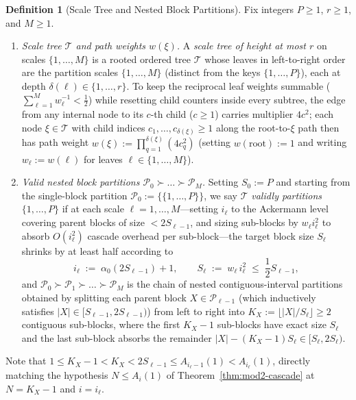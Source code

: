 \documentclass[11pt]{article}
\theoremstyle{definition}
\newtheorem{definition}[theorem]{Definition}
\theoremstyle{remark}
\begin{document}
\begin{definition}[Scale Tree and Nested Block Partitions]
\label{def:scale-tree}
Fix integers $P \ge 1$, $r \ge 1$, and $M \ge 1$.
\begin{enumerate}[label=(\arabic*), leftmargin=2em, itemsep=2pt]
  \item \emph{Scale tree $\mathcal{T}$ and path weights $w(\xi)$.} A \emph{scale tree of height at most $r$} on scales $\{1, \dots, M\}$ is a rooted ordered tree $\mathcal{T}$ whose leaves in left-to-right order are the partition scales $\{1, \dots, M\}$ (distinct from the keys $\{1, \dots, P\}$), each at depth $\delta(\ell) \in \{1, \dots, r\}$. To keep the reciprocal leaf weights summable ($\sum_{\ell=1}^M w_\ell^{-1} < \frac{1}{2}$) while resetting child counters inside every subtree, the edge from any internal node to its $c$-th child ($c \ge 1$) carries multiplier $4 c^2$; each node $\xi \in \mathcal{T}$ with child indices $c_1, \dots, c_{\delta(\xi)} \ge 1$ along the root-to-$\xi$ path then has path weight $w(\xi) := \prod_{q=1}^{\delta(\xi)} (4 c_q^2)$ (setting $w(\mathrm{root}) := 1$ and writing $w_\ell := w(\ell)$ for leaves $\ell \in \{1, \dots, M\}$).
  \item \emph{Valid nested block partitions $\mathcal{P}_0 \succ \dots \succ \mathcal{P}_M$.} Setting $S_0 := P$ and starting from the single-block partition $\mathcal{P}_0 := \{\{1, \dots, P\}\}$, we say $\mathcal{T}$ \emph{validly partitions} $\{1, \dots, P\}$ if at each scale $\ell = 1, \dots, M$---setting $i_\ell$ to the Ackermann level covering parent blocks of size $< 2 S_{\ell-1}$, and sizing sub-blocks by $w_\ell i_\ell^2$ to absorb $O(i_\ell^2)$ cascade overhead per sub-block---the target block size $S_\ell$ shrinks by at least half according to
  \[
  i_\ell \;:=\; \alpha_0(2 S_{\ell-1}) + 1, \qquad
  S_\ell \;:=\; w_\ell\,i_\ell^2 \;\le\; \frac{1}{2} S_{\ell-1},
  \]
  and $\mathcal{P}_0 \succ \mathcal{P}_1 \succ \dots \succ \mathcal{P}_M$ is the chain of nested contiguous-interval partitions obtained by splitting each parent block $X \in \mathcal{P}_{\ell-1}$ (which inductively satisfies $|X| \in [S_{\ell-1}, 2 S_{\ell-1})$) from left to right into $K_X := \lfloor |X| / S_\ell \rfloor \ge 2$ contiguous sub-blocks, where the first $K_X - 1$ sub-blocks have exact size $S_\ell$ and the last sub-block absorbs the remainder $|X| - (K_X - 1) S_\ell \in [S_\ell, 2 S_\ell)$.
\end{enumerate}
Note that $1 \le K_X - 1 < K_X < 2 S_{\ell-1} \le A_{i_\ell - 1}(1) < A_{i_\ell}(1)$, directly matching the hypothesis $N \le A_i(1)$ of Theorem~\ref{thm:mod2-cascade} at $N = K_X - 1$ and $i = i_\ell$.
\end{definition}
\end{document}
